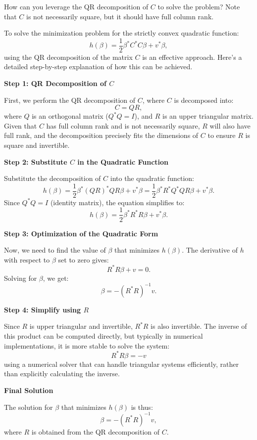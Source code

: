 \documentclass[8pt]{article}
\begin{document}
How can you leverage the QR decomposition of \( C \) to solve the problem? Note that \( C \) is not necessarily square, but it should have full column rank.

To solve the minimization problem for the strictly convex quadratic function:
\[
h(\beta) = \frac{1}{2} \beta^* C^* C \beta + v^* \beta,
\]
using the QR decomposition of the matrix \( C \) is an effective approach. Here's a detailed step-by-step explanation of how this can be achieved.

\textbf{Step 1: QR Decomposition of \( C \)}

First, we perform the QR decomposition of \( C \), where \( C \) is decomposed into:
\[
C = QR,
\]
where \( Q \) is an orthogonal matrix (\( Q^*Q = I \)), and \( R \) is an upper triangular matrix. Given that \( C \) has full column rank and is not necessarily square, \( R \) will also have full rank, and the decomposition precisely fits the dimensions of \( C \) to ensure \( R \) is square and invertible.

\textbf{Step 2: Substitute \( C \) in the Quadratic Function}

Substitute the decomposition of \( C \) into the quadratic function:
\[
h(\beta) = \frac{1}{2} \beta^* (QR)^* QR \beta + v^* \beta = \frac{1}{2} \beta^* R^* Q^* QR \beta + v^* \beta.
\]
Since \( Q^*Q = I \) (identity matrix), the equation simplifies to:
\[
h(\beta) = \frac{1}{2} \beta^* R^* R \beta + v^* \beta.
\]

\textbf{Step 3: Optimization of the Quadratic Form}

Now, we need to find the value of \( \beta \) that minimizes \( h(\beta) \). The derivative of \( h \) with respect to \( \beta \) set to zero gives:
\[
R^* R \beta + v = 0.
\]
Solving for \( \beta \), we get:
\[
\beta = -(R^* R)^{-1} v.
\]

\textbf{Step 4: Simplify using \( R \)}

Since \( R \) is upper triangular and invertible, \( R^* R \) is also invertible. The inverse of this product can be computed directly, but typically in numerical implementations, it is more stable to solve the system:
\[
R^* R \beta = -v
\]
using a numerical solver that can handle triangular systems efficiently, rather than explicitly calculating the inverse.

\textbf{Final Solution}

The solution for \( \beta \) that minimizes \( h(\beta) \) is thus:
\[
\beta = -(R^* R)^{-1} v,
\]
where \( R \) is obtained from the QR decomposition of \( C \).
\end{document}
